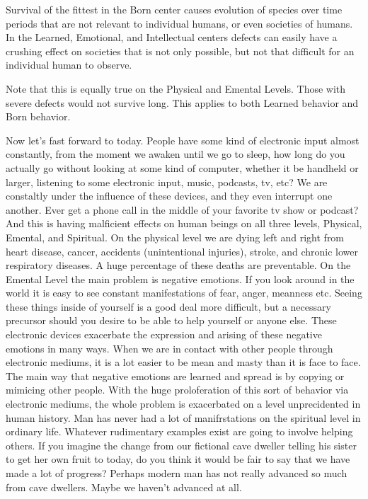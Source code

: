 \documentclass[12pt,letterpaper]{book}
\begin{document}
Survival of the fittest in the Born center causes evolution of species over time periods that are not relevant to individual humans, or even societies of humans. In the Learned, Emotional, and Intellectual centers defects can easily have a crushing effect on societies that is not only possible, but not that difficult for an individual human to observe.

Note that this is equally true on the Physical and Emental Levels. Those with severe defects would not survive long. This applies to both Learned behavior and Born behavior. 

Now let's fast forward to today. People have some kind of electronic input almost constantly, from the moment we awaken until we go to sleep, how long do you actually go without looking at some kind of computer, whether it be handheld or larger, listening to some electronic input, music, podcasts, tv, etc? We are constaltly under the influence of these devices, and they even interrupt one another. Ever get a phone call in the middle of your favorite tv show or podcast? And this is having malficient effects on human beings on all three levels, Physical, Emental, and Spiritual. On the physical level we are dying left and right from heart disease, cancer, accidents (unintentional injuries), stroke, and chronic lower respiratory diseases. A huge percentage of these deaths are preventable. On the Emental Level the main problem is negative emotions. If you look around in the world it is easy to see constant manifestations of fear, anger, meanness etc. Seeing these things inside of yourself is a good deal more difficult, but a necessary precursor should you desire to be able to help yourself or anyone else. These electronic devices exacerbate the expression and arising of these negative emotions in many ways. When we are in contact with other people through electronic mediums, it is a lot easier to be mean and masty than it is face to face. The main way that negative emotions are learned and spread is by copying or mimicing other people. With the huge proloferation of this sort of behavior via electronic mediums, the whole problem is exacerbated on a level unprecidented in human history. Man has never had a lot of manifrstations on the spiritual level in ordinary life. Whatever rudimentary examples exist are going to involve helping others. If you imagine the change from our fictional cave dweller telling his sister to get her own fruit to today, do you think it would be fair to say that we have made a lot of progress? Perhaps modern man has not really advanced so much from cave dwellers. Maybe we haven't advanced at all.
\end{document}

